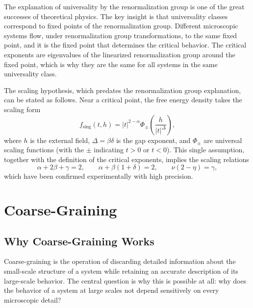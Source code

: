 \documentclass[11pt, twoside, openright]{book}
\theoremstyle{dotted}
\theoremstyle{definition}
\begin{document}
The explanation of universality by the renormalization group is one of the great
successes of theoretical physics. The key insight is that universality classes
correspond to fixed points of the renormalization group. Different microscopic
systems flow, under renormalization group transformations, to the same fixed point,
and it is the fixed point that determines the critical behavior. The critical
exponents are eigenvalues of the linearized renormalization group around the fixed
point, which is why they are the same for all systems in the same universality class.

The scaling hypothesis, which predates the renormalization group explanation, can
be stated as follows. Near a critical point, the free energy density takes the
scaling form
\begin{equation}
  f_{\text{sing}}(t, h) = |t|^{2-\alpha} \Phi_\pm\!\left(\frac{h}{|t|^\Delta}\right),
  \label{eq:scaling_hypothesis}
\end{equation}
where $h$ is the external field, $\Delta = \beta\delta$ is the gap exponent, and
$\Phi_\pm$ are universal scaling functions (with the $\pm$ indicating $t > 0$ or
$t < 0$). This single assumption, together with the definition of the critical
exponents, implies the scaling relations
\begin{equation}
  \alpha + 2\beta + \gamma = 2, \qquad \alpha + \beta(1+\delta) = 2,
  \qquad \nu(2-\eta) = \gamma,
\end{equation}
which have been confirmed experimentally with high precision.

\chapter{Coarse-Graining}
\label{ch:coarsegraining}

\section{Why Coarse-Graining Works}

Coarse-graining is the operation of discarding detailed information about the
small-scale structure of a system while retaining an accurate description of its
large-scale behavior. The central question is why this is possible at all: why does
the behavior of a system at large scales not depend sensitively on every microscopic
detail?
\end{document}

